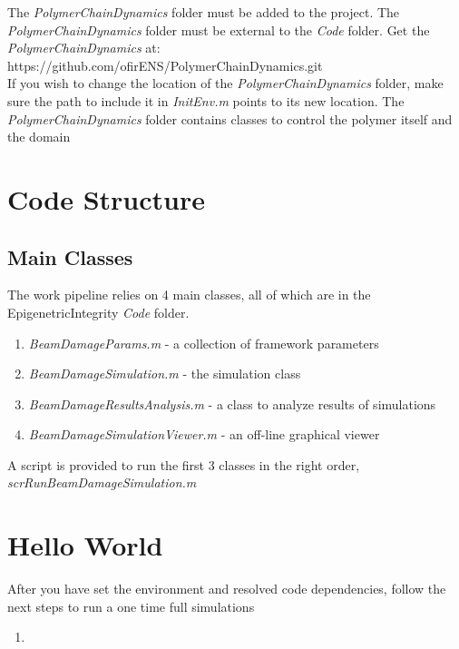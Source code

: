 \documentclass[12pt]{article}
\begin{document}
	The \textit{PolymerChainDynamics} folder must be added to the project. The \textit{PolymerChainDynamics} folder must be external to the \textit{Code} folder. Get the \textit{PolymerChainDynamics} at:\\
	https://github.com/ofirENS/PolymerChainDynamics.git\\
	If you wish to change the location of the \textit{PolymerChainDynamics} folder, make sure the path to include it in \textit{InitEnv.m} points to its new location.	
	The \textit{PolymerChainDynamics} folder contains classes to control the polymer itself and the domain
	
	\section{Code Structure}
	\subsection{Main Classes}
	The work pipeline relies on 4 main classes, all of which are in the EpigenetricIntegrity \textit{Code} folder. 
	\begin{enumerate}
		\item \textit{BeamDamageParams.m} - a collection of framework parameters 
		\item \textit{BeamDamageSimulation.m} - the simulation class
		\item \textit{BeamDamageResultsAnalysis.m} - a class to analyze results of simulations 
		\item \textit{BeamDamageSimulationViewer.m} - an off-line graphical viewer
	\end{enumerate}
    A script is provided to run the first 3 classes in the right order, \textit{scrRunBeamDamageSimulation.m}
     	
	\section{Hello World}
	After you have set the environment and resolved code dependencies, follow the next steps to run a one time full simulations 
	\begin{enumerate}
	\item 
	\end{enumerate}
	
\end{document}
